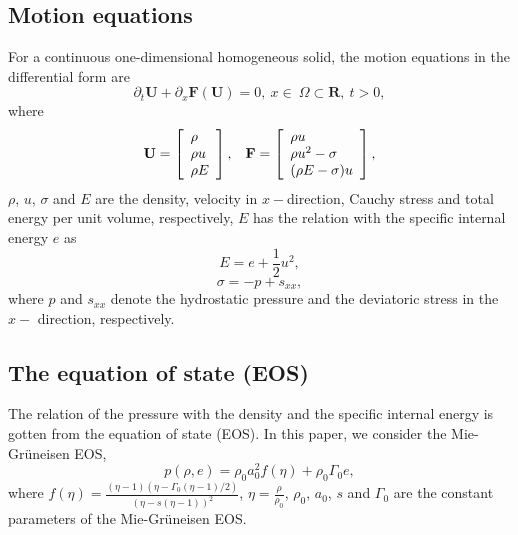\documentclass[review]{elsarticle}
\numberwithin{equation}{section}
\numberwithin{table}{section}
\begin{document}
\subsection{Motion equations}
For  a continuous one-dimensional homogeneous solid, the motion equations  in  the  differential form are
\begin{equation*}
\partial_t \mathbf{{U}} + \partial _x \bm{F}(\mathbf{{U}}) = 0, \   x \in \   \Omega \subset \mathbf{R}, \  t>0,
\end{equation*}
where
\begin{equation}
  \mathbf{U} = \left[ \begin{array}{l}
      \rho \\
      \rho u \\
      \rho  E \\
    \end{array}
  \right],
  \hspace{0.3cm}
  \mathbf{F} = \left[ \begin{array}{l}
      \rho u \\
      \rho u^2 -\sigma\\
      (\rho E -\sigma)u\\
  \end{array} \right],
\end{equation}
$\rho$, $u$, $\sigma$ and $E$ are  the density, velocity in $x-$direction, Cauchy stress and total energy per unit volume, respectively, $E$ has the relation with the  specific internal energy $e$ as
\begin{equation} \label{te1}
  E = e+\frac{1}{2}u^2,
\end{equation}
\begin{equation}\label{sigma1}
  \sigma = -p +s_{xx},
\end{equation}
where $p$ and $s_{xx}$ denote the  hydrostatic pressure and the deviatoric stress in the $x-$ direction, respectively.

\subsection{The equation of state (EOS)}

The relation of the pressure with  the density and the specific internal energy is gotten from the equation of state (EOS). In this paper, we consider the Mie-Gr\"uneisen EOS,
\begin{equation}\label{eq:mie}
  p(\rho,e) = \rho_0 a_0^2f(\eta)+ \rho_0 \Gamma_0 e,
\end{equation}
where $f(\eta) = \frac{(\eta-1)(\eta-\Gamma_0(\eta-1)/2)}{(\eta-s(\eta-1))^2}$, $\eta = \frac{\rho}{\rho_0}$, $\rho_0$, $a_0$, $s$ and $\Gamma_0$ are  the constant parameters of the Mie-Gr\"uneisen EOS.
\end{document}
